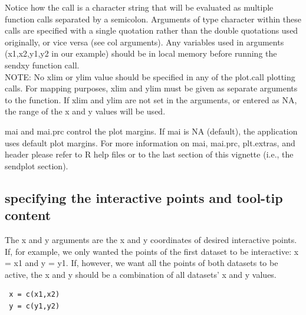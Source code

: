 \documentclass[]{article}
\begin{document}
Notice how the call is a character string that will be evaluated as multiple function calls separated by a semicolon. Arguments of type character within these calls are specified with a single quotation rather than the double quotations used originally, or vice versa (see col arguments). Any variables used in arguments (x1,x2,y1,y2 in our example) should be in local memory before running the sendxy function call. \\ \indent NOTE: No xlim or ylim value should be specified in any of the plot.call plotting calls. For mapping purposes, xlim and ylim must be given as separate arguments to the function. If xlim and ylim are not set in the arguments, or entered as NA, the range of the x and y values will be used. \newline

\indent mai and mai.prc control the plot margins. If mai is NA (default), the application uses default plot margins. For more information on mai, mai.prc, plt.extras, and header please refer to R help files or to the last section of this vignette (i.e., the sendplot section). \newline

\subsection{specifying the interactive points and tool-tip content}

\indent The x and y arguments are the x and y coordinates of desired interactive points. If, for example, we only wanted the points of the first dataset to be interactive: x = x1 and y = y1.  If, however, we want all the points of both datasets to be active, the x and y should be a combination of all datasets' x and y values.  
\begin{verbatim}
 x = c(x1,x2)
 y = c(y1,y2)
\end{verbatim}
\end{document}

